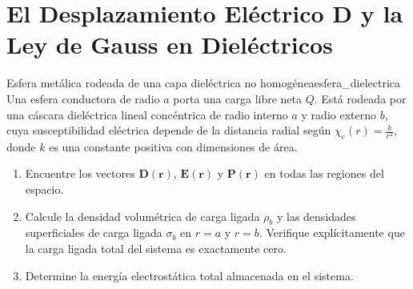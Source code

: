 \documentclass[11pt,a4paper]{book}
\newcommand{\Evec}{\bm{E}}
\newcommand{\Dvec}{\bm{D}}
\newcommand{\Pvec}{\bm{P}}
\begin{document}
\section[Desplazamiento eléctrico y ley de Gauss]{El Desplazamiento Eléctrico \texorpdfstring{$\Dvec$}{D} y la Ley de Gauss en Dieléctricos}

\begin{ejercicio}{Esfera metálica rodeada de una capa dieléctrica no homogénea}{esfera_dielectrica}
Una esfera conductora de radio $a$ porta una carga libre neta $Q$. Está rodeada por una cáscara dieléctrica lineal concéntrica de radio interno $a$ y radio externo $b$, cuya susceptibilidad eléctrica depende de la distancia radial según $\chi_e(r) = \frac{k}{r^2}$, donde $k$ es una constante positiva con dimensiones de área.
\begin{enumerate}[label=\alph*)]
    \item Encuentre los vectores $\Dvec(\bm{r})$, $\Evec(\bm{r})$ y $\Pvec(\bm{r})$ en todas las regiones del espacio.
    \item Calcule la densidad volumétrica de carga ligada $\rho_b$ y las densidades superficiales de carga ligada $\sigma_b$ en $r=a$ y $r=b$. Verifique explícitamente que la carga ligada total del sistema es exactamente cero.
    \item Determine la energía electrostática total almacenada en el sistema.
\end{enumerate}
\end{ejercicio}
\end{document}
